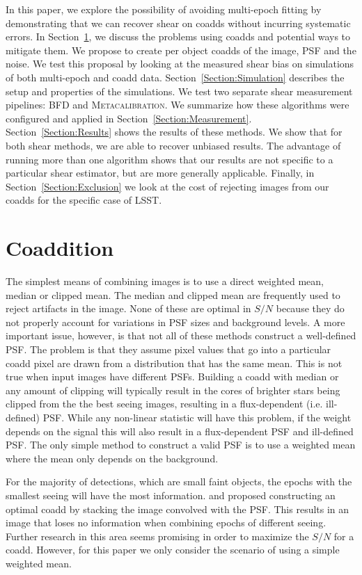 \documentclass[fleqn,useAMS,usenatbib]{mnras}
\newcommand{\Mcal}{\textsc{Metacalibration}}
\begin{document}
In this paper, we explore the possibility of avoiding multi-epoch fitting by 
demonstrating that we can recover shear on coadds without incurring systematic 
errors.  In Section~\ref{Section:Coaddition}, we discuss the problems using 
coadds and potential ways to mitigate them.  We propose to create per object 
coadds of the image, PSF and the noise.  We test this proposal by looking at 
the measured shear bias on simulations of both multi-epoch and coadd data.  
Section~\ref{Section:Simulation} describes the setup and properties of the 
simulations.  We test two separate shear measurement pipelines: BFD and 
\Mcal.  We summarize how these algorithms were configured and applied 
in Section~\ref{Section:Measurement}.  Section~\ref{Section:Results} shows the 
results of these methods.  We show that for both shear methods, we are able to 
recover unbiased results.  The advantage of running more than one algorithm 
shows that our results are not specific to a particular shear estimator, but 
are more generally applicable.   Finally, in Section~\ref{Section:Exclusion} 
we look at the cost of rejecting images from our coadds for the specific case 
of LSST.

\section{Coaddition}
\label{Section:Coaddition}

The simplest means of combining images is to use a direct weighted mean, median or 
clipped mean.  The median and clipped mean are frequently used to reject artifacts in the image.
None of these are optimal in $S/N$ because they do not properly 
account for variations in PSF sizes and background levels. A more important
issue, however, is that not all of these methods construct a well-defined PSF.  
The problem is that they assume pixel values that go into a particular coadd pixel are drawn from 
a distribution that has the same mean.  This is not true when input images have different PSFs.
Building a coadd with median or any amount of clipping 
will typically result in the cores of brighter stars being clipped from the the 
best seeing images, resulting in a flux-dependent (i.e. ill-defined) PSF.  While any non-linear
statistic will have this problem, if the weight depends on the signal this will also result
in a flux-dependent PSF and ill-defined PSF.  The only simple method to construct a valid
PSF is to use a weighted mean where the mean only depends on the background.


For the majority of 
detections, which are small faint objects, the epochs with the smallest seeing 
will have the most information.  \cite{Kaiser2004} and \cite{Zackay2017} proposed 
constructing an optimal coadd by stacking the image convolved with the PSF.  
This results in an image that loses no information when combining epochs of 
different seeing.  Further research in this area seems promising in order to 
maximize the $S/N$ for a coadd.  However, for this paper we only consider the 
scenario of using a simple weighted mean.  
\end{document}
